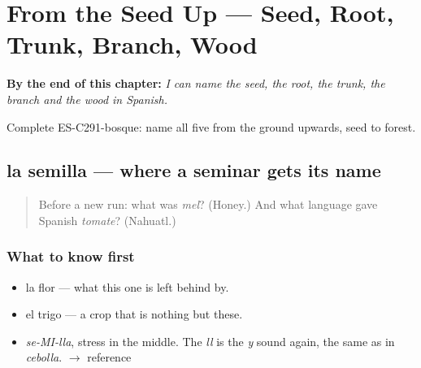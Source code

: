 
\chapter{From the Seed Up --- Seed, Root, Trunk, Branch, Wood}
\label{ch:de-la-semilla}

\begin{chapteropening}
\textbf{By the end of this chapter:} \emph{I can name the seed, the root, the trunk, the branch and the wood in Spanish.}

Complete ES-C291-bosque: name all five from the ground upwards, seed to forest.
\end{chapteropening}

\section[la semilla]{la semilla — where a seminar gets its name}

\label{lesson:ES-C291-semilla}



\begin{quote}
Before a new run: what was \emph{mel}? (Honey.) And what language gave Spanish \emph{tomate}? (Nahuatl.)
\end{quote}

\subsection*{What to know first}
\begin{itemize}
\raggedright
  \item la flor — what this one is left behind by.
  \item el trigo — a crop that is nothing but these.
\end{itemize}

\begin{sounds}
\begin{itemize}
\raggedright
  \item \emph{se-MI-lla}, stress in the middle. The \emph{ll} is the \emph{y} sound again, the same as in \emph{cebolla}. $\to$ reference
\end{itemize}
\end{sounds}

